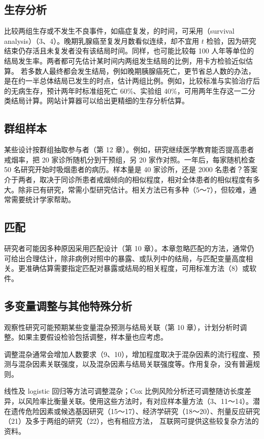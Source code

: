 \subsection{生存分析}
比较两组生存或不发生不良事件，如癌症复发，的时间，可采用（survival analysis）（3、4）。晚期乳腺癌至复发月数看似连续，却不宜用 $t$ 检验，因为研究结束仍存活且未复发者没有该结局时间。同样，也可能比较每 100 人年等单位的结局发生率。两者都可先估计某时间内两组发生结局的比例，用卡方检验近似估算。
若多数人最终都会发生结局，例如晚期胰腺癌死亡，更节省总人数的办法，是在约一半总体结局已发生的时点，估计两组比例。例如，比较标准与实验治疗后的无病生存，预计两年时标准组死亡 60\%、实验组 40\%，可用两年生存这一二分类结局计算。网站计算器可以给出更精细的生存分析估算。

\subsection{群组样本}
某些设计按群组抽取参与者（第 12 章）。例如，研究继续医学教育能否提高患者戒烟率，把 20 家诊所随机分到干预组，另 20 家作对照。一年后，每家随机检查 50 名研究开始时吸烟患者的病历。样本量是 40 家诊所，还是 2000 名患者？答案介于两者，取决于同诊所患者戒烟倾向的相似程度，相对全体患者的相似程度有多大。除非已有研究，常需小型研究估计。相关方法已有多种（5～7），但较难，通常需要统计学家帮助。

\subsection{匹配}
研究者可能因多种原因采用匹配设计（第 10 章）。本章忽略匹配的方法，通常仍可给出合理估计，除非病例对照中的暴露、或队列中的结局，与匹配变量高度相关。更准确估算需要指定匹配对暴露或结局的相关程度，可用标准方法（8）或软件。

\subsection{多变量调整与其他特殊分析}
观察性研究可能预期某些变量混杂预测与结局关联（第 10 章），计划分析时调整。如果主要假设检验包括调整，样本量也应考虑。

调整混杂通常会增加人数要求（9、10），增加程度取决于混杂因素的流行程度、预测与混杂因素关联强度，以及混杂因素与结局关联强度等。作用复杂，没有普遍规则。

线性及 logistic 回归等方法可调整混杂；Cox 比例风险分析还可调整随访长度差异，以风险率比衡量关联。使用这些方法时，有对应样本量方法（3、11～14）。潜在遗传危险因素或候选基因研究（15～17）、经济学研究（18～20）、剂量反应研究（21）及多于两组的研究（22），也有相应方法，
互联网可提供这些较复杂方法的资料。

